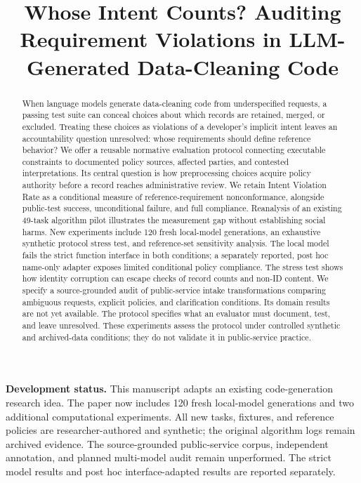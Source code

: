 \documentclass[manuscript,screen,review,anonymous]{acmart}
\title[Whose Intent Counts?]{Whose Intent Counts? Auditing Requirement Violations in LLM-Generated Data-Cleaning Code}
\begin{document}
\begin{abstract}
When language models generate data-cleaning code from underspecified requests, a passing test suite can conceal choices about which records are retained, merged, or excluded. Treating these choices as violations of a developer's implicit intent leaves an accountability question unresolved: whose requirements should define reference behavior? We offer a reusable normative evaluation protocol connecting executable constraints to documented policy sources, affected parties, and contested interpretations. Its central question is how preprocessing choices acquire policy authority before a record reaches administrative review. We retain Intent Violation Rate as a conditional measure of reference-requirement nonconformance, alongside public-test success, unconditional failure, and full compliance. Reanalysis of an existing 49-task algorithm pilot illustrates the measurement gap without establishing social harms. New experiments include 120 fresh local-model generations, an exhaustive synthetic protocol stress test, and reference-set sensitivity analysis. The local model fails the strict function interface in both conditions; a separately reported, post hoc name-only adapter exposes limited conditional policy compliance. The stress test shows how identity corruption can escape checks of record counts and non-ID content. We specify a source-grounded audit of public-service intake transformations comparing ambiguous requests, explicit policies, and clarification conditions. Its domain results are not yet available. The protocol specifies what an evaluator must document, test, and leave unresolved. These experiments assess the protocol under controlled synthetic and archived-data conditions; they do not validate it in public-service practice.
\end{abstract}
\maketitle

\noindent\textbf{Development status.} This manuscript adapts an existing code-generation research idea. The paper now includes 120 fresh local-model generations and two additional computational experiments. All new tasks, fixtures, and reference policies are researcher-authored and synthetic; the original algorithm logs remain archived evidence. The source-grounded public-service corpus, independent annotation, and planned multi-model audit remain unperformed. The strict model results and post hoc interface-adapted results are reported separately.
\end{document}
